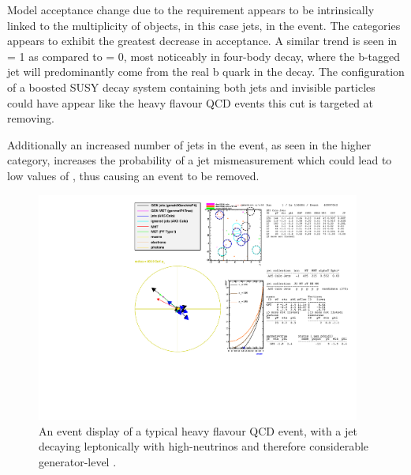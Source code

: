 Model acceptance change due to the requirement appears to be intrinsically
linked to the multiplicity of objects, in this case jets, in the event. The
\njhigh categories appears to exhibit the greatest decrease in acceptance. A
similar trend is
seen in \nb = 1 as compared to \nb = 0, most noticeably in four-body decay,
where the b-tagged jet will predominantly come from the real b quark in the
decay. The configuration of a boosted SUSY decay system containing both jets and
invisible \chiz particles could have appear like the heavy flavour QCD events
this cut is targeted at removing. 

Additionally an increased number of jets in the event, as seen in the higher \nj
category, increases the probability of a jet mismeasurement which could lead to
low values of \mindphistar, thus causing an event to be removed.

\clearpage
\begin{figure}
    \centering
    \includegraphics[width=0.95\textwidth]
    {Figs/eventDisplays/Had_QCD_MG_MC_HT375_skim_displays_singleEvent_2_noPF.pdf}
    \caption{An event display of a typical heavy flavour QCD event, with a jet
    decaying leptonically with high-\Pt neutrinos and therefore considerable
    generator-level \met.}
    \label{fig:event_display_QCD}
\end{figure}
